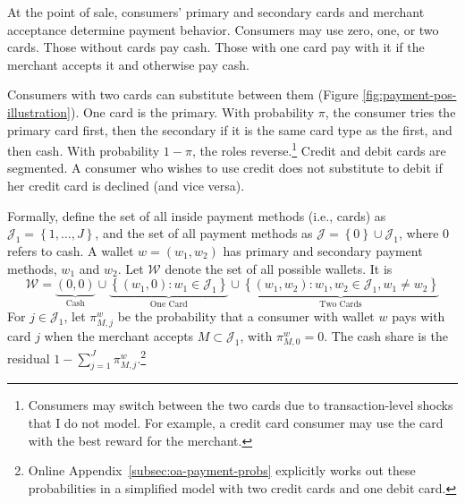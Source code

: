 \documentclass[main.tex]{subfiles}
\begin{document}
At the point of sale, consumers' primary and secondary cards and merchant acceptance determine payment behavior.
Consumers may use zero, one, or two cards.
Those without cards pay cash.
Those with one card pay with it if the merchant accepts it and otherwise pay cash.

Consumers with two cards can substitute between them (Figure \ref{fig:payment-pos-illustration}).
One card is the primary.
With probability $\pi$, the consumer tries the primary card first, then the secondary if it is the same card type as the first, and then cash.
With probability $1-\pi$, the roles reverse.\footnote{Consumers may switch between the two cards due to transaction-level shocks that I do not model.
For example, a credit card consumer may use the card with the best reward for the merchant.\label{foot:reward-pos-switch}}
Credit and debit cards are segmented.
A consumer who wishes to use credit does not substitute to debit if her credit card is declined (and vice versa).

Formally, define the set of all inside payment methods (i.e., cards) as $\mathcal{J}_{1}=\left\{ 1,\dots,J\right\} $, and the set of all payment methods as $\mathcal{J}=\left\{ 0\right\} \cup\mathcal{J}_{1}$, where $0$ refers to cash.
A wallet $w=\left(w_{1},w_{2}\right)$ has primary and secondary payment methods, $w_{1}$ and $w_{2}$.
Let $\mathcal{W}$ denote the set of all possible wallets.
It is
\[
\mathcal{W} = 
\underbrace{\left(0, 0\right)}_{\text{Cash}} 
\cup 
\underbrace{\left\{\left(w_1, 0\right) : w_1 \in \mathcal{J}_1 \right\}}_{\text{One Card}} 
\cup 
\underbrace{\left\{\left(w_1, w_2\right) : w_1, w_2 \in \mathcal{J}_1, w_1 \neq w_2\right\}}_{\text{Two Cards}}
\]
For $j\in\mathcal{J}_{1}$, let $\pi_{M,j}^{w}$ be the probability that a consumer with wallet $w$ pays with card $j$ when the merchant accepts $M\subset\mathcal{J}_{1}$, with $\pi^w_{M,0}=0$. The cash share is the residual $1-\sum_{j=1}^J\pi^w_{M,j}$.\footnote{Online Appendix~\ref{subsec:oa-payment-probs} explicitly works out these probabilities in a simplified model with two credit cards and one debit card.}

\end{document}
